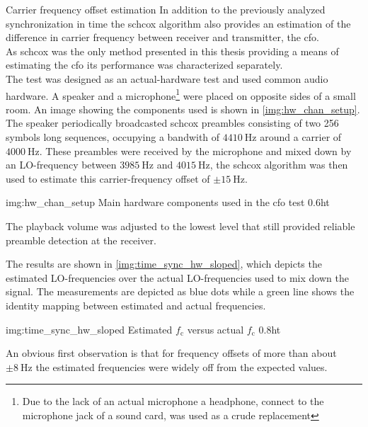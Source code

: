 \begin{subchapter}{Carrier frequency offset estimation}
  In addition to the previously analyzed synchronization in time
  the \gls{schcox} algorithm also provides an estimation of
  the difference in carrier frequency between receiver and
  transmitter, the \acrfull{cfo}. \\

  As \gls{schcox} was the only method presented in this thesis
  providing a means of estimating the \gls{cfo}
  its performance was characterized separately. \\

  The test was designed as an actual-hardware test
  and used common audio hardware.
  A speaker and a microphone\footnote{Due to the lack of an actual
  microphone a headphone, connect to the microphone jack of a sound card,
  was used as a crude replacement}
  were placed on opposite sides of a small room.
  An image showing the components used
  is shown in \autoref{img:hw_chan_setup}. The speaker periodically broadcasted
  \gls{schcox} preambles consisting of two 256 symbols long
  sequences, occupying a bandwith of $\SI{4410}{\hertz}$
  around a carrier of $\SI{4000}{\hertz}$.
  These preambles were received by the microphone and mixed
  down by an LO-frequency between $\SI{3985}{\hertz}$ and $\SI{4015}{\hertz}$,
  the \gls{schcox} algorithm was then used to estimate
  this carrier-frequency offset of $\pm\SI{15}{\hertz}$.

                  {img:hw_chan_setup}
                  {Main hardware components used in the \acrshort{cfo} test}
                  {0.6}{ht}

  The playback volume was adjusted to the lowest level
  that still provided reliable preamble detection at the receiver.

  The results are shown in \autoref{img:time_sync_hw_sloped},
  which depicts the estimated LO-frequencies over the
  actual LO-frequencies used to mix down the signal.
  The measurements are depicted as blue dots while a
  green line shows the identity mapping between estimated
  and actual frequencies.

                  {img:time_sync_hw_sloped}
                  {Estimated $f_\text{c}$ versus actual $f_\text{c}$}
                  {0.8}{ht}

  An obvious first observation is that for frequency offsets of
  more than about $\pm\SI{8}{\hertz}$ the estimated frequencies
  were widely off from the expected values.


\end{subchapter}
